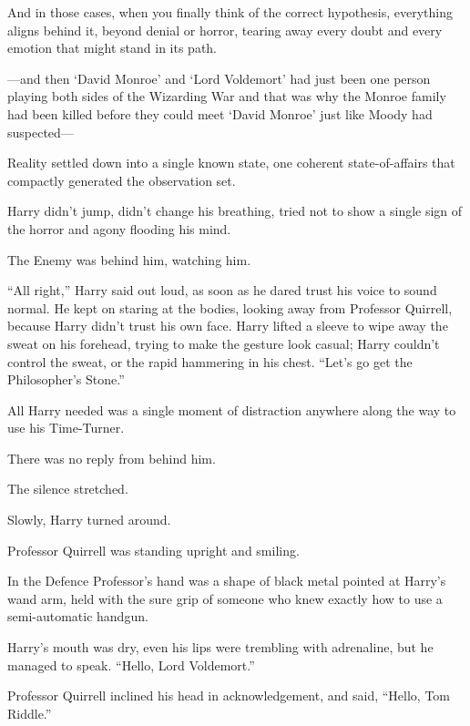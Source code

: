And in those cases, when you finally think of the correct hypothesis, everything aligns behind it, beyond denial or horror, tearing away every doubt and every emotion that might stand in its path.

—and then ‘David Monroe’ and ‘Lord Voldemort’ had just been one person playing both sides of the Wizarding War and that was why the Monroe family had been killed before they could meet ‘David Monroe’ just like Moody had suspected—

Reality settled down into a single known state, one coherent state-of-affairs that compactly generated the observation set.

Harry didn’t jump, didn’t change his breathing, tried not to show a single sign of the horror and agony flooding his mind.

The Enemy was behind him, watching him.

“All right,” Harry said out loud, as soon as he dared trust his voice to sound normal. He kept on staring at the bodies, looking away from Professor Quirrell, because Harry didn’t trust his own face. Harry lifted a sleeve to wipe away the sweat on his forehead, trying to make the gesture look casual; Harry couldn’t control the sweat, or the rapid hammering in his chest.
“Let’s go get the Philosopher’s Stone.”

All Harry needed was a single moment of distraction anywhere along the way to use his Time-Turner.

There was no reply from behind him.

The silence stretched.

Slowly, Harry turned around.

Professor Quirrell was standing upright and smiling.

In the Defence Professor’s hand was a shape of black metal pointed at Harry’s wand arm, held with the sure grip of someone who knew exactly how to use a semi-automatic handgun.

Harry’s mouth was dry, even his lips were trembling with adrenaline, but he managed to speak.
“Hello, Lord Voldemort.”

Professor Quirrell inclined his head in acknowledgement, and said,
“Hello, Tom Riddle.”

